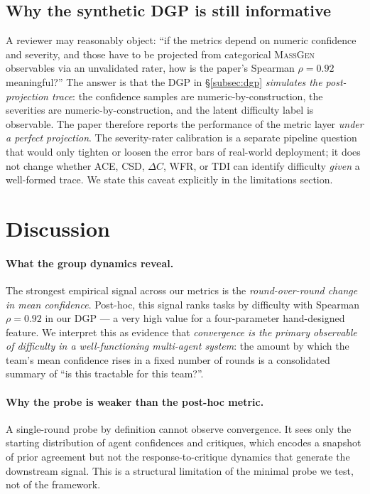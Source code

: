 \documentclass[10pt,a4paper]{article}
\begin{document}
\subsection{Why the synthetic DGP is still informative}

A reviewer may reasonably object: ``if the metrics depend on numeric
confidence and severity, and those have to be projected from categorical
\textsc{MassGen} observables via an unvalidated rater, how is the paper's
Spearman $\rho\!=\!0.92$ meaningful?'' The answer is that the DGP in
\S\ref{subsec:dgp} \emph{simulates the post-projection trace}: the
confidence samples are numeric-by-construction, the severities are
numeric-by-construction, and the latent difficulty label is observable. The
paper therefore reports the performance of the metric layer \emph{under a
perfect projection}. The severity-rater calibration is a separate pipeline
question that would only tighten or loosen the error bars of real-world
deployment; it does not change whether ACE, CSD, $\Delta C$, WFR, or TDI
can identify difficulty \emph{given} a well-formed trace. We state this
caveat explicitly in the limitations section.

\section{Discussion}\label{sec:discussion}

\paragraph{What the group dynamics reveal.} The strongest empirical signal
across our metrics is the \emph{round-over-round change in mean confidence}.
Post-hoc, this signal ranks tasks by difficulty with Spearman $\rho\!=\!0.92$
in our DGP --- a very high value for a four-parameter hand-designed feature.
We interpret this as evidence that \emph{convergence is the primary
observable of difficulty in a well-functioning multi-agent system}: the
amount by which the team's mean confidence rises in a fixed number of rounds
is a consolidated summary of ``is this tractable for this team?''.

\paragraph{Why the probe is weaker than the post-hoc metric.} A single-round
probe by definition cannot observe convergence. It sees only the starting
distribution of agent confidences and critiques, which encodes a snapshot of
prior agreement but not the response-to-critique dynamics that generate the
downstream signal. This is a structural limitation of the minimal probe we
test, not of the framework.
\end{document}
